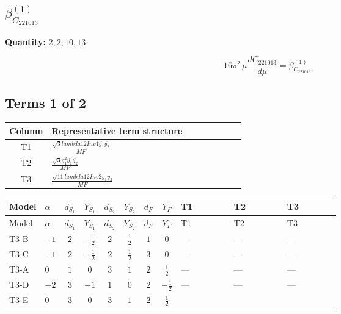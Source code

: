 \documentclass[8pt]{article}
\begin{document}
\begin{landscape}
\section*{$\beta_{C_{221013}}^{(1)}$}
\noindent\textbf{Quantity: }$\mathrm{2,2,10,13}$\par\smallskip
\[16\pi^2\,\mu\frac{d C_{221013}}{d\mu}=\beta_{C_{221013}}^{(1)}\]
\subsection*{Terms 1 of 2}
\begin{center}
\begin{tabular}{@{}c >{\raggedright\arraybackslash}p{0.82\linewidth}@{}}
\toprule
Column & Representative term structure \\
\midrule
T1 & \(\displaystyle \frac{\sqrt{3} lambda12Inv1 \overline{y_{1}} \overline{y_{2}}}{MF}\) \\
\midrule
T2 & \(\displaystyle \frac{\sqrt{3} g_{1}^{2} \overline{y_{1}} \overline{y_{2}}}{MF}\) \\
\midrule
T3 & \(\displaystyle \frac{\sqrt{11} lambda12Inv2 \overline{y_{1}} \overline{y_{2}}}{MF}\) \\
\midrule
\bottomrule
\end{tabular}
\end{center}
\smallskip
\tiny
\begin{longtable}{@{}llcccccc >{\raggedright\arraybackslash}p{0.21\linewidth} >{\raggedright\arraybackslash}p{0.21\linewidth} >{\raggedright\arraybackslash}p{0.21\linewidth}@{}}
\toprule
Model & $\alpha$ & $d_{S_1}$ & $Y_{S_1}$ & $d_{S_2}$ & $Y_{S_2}$ & $d_F$ & $Y_F$ & T1 & T2 & T3 \\
\midrule
\endfirsthead
\toprule
Model & $\alpha$ & $d_{S_1}$ & $Y_{S_1}$ & $d_{S_2}$ & $Y_{S_2}$ & $d_F$ & $Y_F$ & T1 & T2 & T3 \\
\midrule
\endhead
T3-B & $-1$ & $2$ & $-\frac{1}{2}$ & $2$ & $\frac{1}{2}$ & $1$ & $0$ & --- & --- & --- \\
\midrule
T3-C & $-1$ & $2$ & $-\frac{1}{2}$ & $2$ & $\frac{1}{2}$ & $3$ & $0$ & --- & --- & --- \\
\midrule
T3-A & $0$ & $1$ & $0$ & $3$ & $1$ & $2$ & $\frac{1}{2}$ & --- & --- & --- \\
\midrule
T3-D & $-2$ & $3$ & $-1$ & $1$ & $0$ & $2$ & $-\frac{1}{2}$ & --- & --- & --- \\
\midrule
T3-E & $0$ & $3$ & $0$ & $3$ & $1$ & $2$ & $\frac{1}{2}$ & \scriptsize\adjustbox{max width=\linewidth}{$\begin{gathered} - \frac{\sqrt{3} lambda12Inv1 \overline{y_{1}} \overline{y_{2}}}{6 MF}\end{gathered}$} & \scriptsize\adjustbox{max width=\linewidth}{$\begin{gathered} \frac{\sqrt{3} g_{1}^{2} \overline{y_{1}} \overline{y_{2}}}{8 MF}\end{gathered}$} & \scriptsize\adjustbox{max width=\linewidth}{$\begin{gathered} \frac{3 \sqrt{11} lambda12Inv2 \overline{y_{1}} \overline{y_{2}}}{22 MF}\end{gathered}$} \\

\end{longtable}
\end{landscape}
\end{document}

